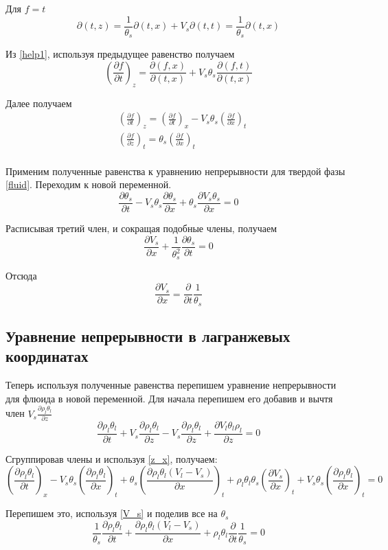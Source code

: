 \documentclass[12pt,a4paper]{article}
\newcommand{\pd}[2]{\frac{\partial #1}{\partial #2}}
\begin{document}
Для $ f = t $ 
$$
\partial(t , z) = \frac{1}{\theta_s} \partial(t , x) + V_s \partial(t , t) = \frac{1}{\theta_s} \partial(t , x)
$$

Из \eqref{help1}, используя предыдущее равенство получаем
$$
\left(\pd{f}{t}\right)_z = \pd{(f , x)}{(t , x)} + V_s \theta_s\pd{(f ,t)}{(t , x)}
$$

Далее получаем
\begin{equation}
\begin{aligned}
&\left(\pd{f}{t}\right)_z = \left(\pd{f}{t}\right)_x - V_s\theta_s\left(\pd{f}{x}\right)_t\\
&\left(\pd{f}{z}\right)_t = \theta_s\left(\pd{f}{x}\right)_t\\
\end{aligned}
\label{z_x}
\end{equation}

Применим полученные равенства к уравнению непрерывности для твердой фазы \eqref{fluid}. Переходим к новой переменной.
$$
\pd{\theta_s}{t} - V_s\theta_s\pd{\theta_s}{x} + \theta_s\pd{V_s\theta_s}{x} =0
$$

Расписывая третий член, и сокращая подобные члены, получаем
$$
\pd{V_s}{x} + \frac{1}{\theta_s^2}\pd{\theta_s}{t} = 0
$$

Отсюда
\begin{equation}
\pd{V_s}{x} = \pd{}{t}\frac{1}{\theta_s}
\label{V_s}
\end{equation}

\subsection{Уравнение непрерывности в лагранжевых координатах}
Теперь используя полученные равенства перепишем уравнение непрерывности для флюида в новой переменной. Для начала перепишем его добавив и вычтя член $V_s\pd{\rho_l\theta_l}{z} $
$$
\pd{\rho_l\theta_l}{t} + V_s\pd{\rho_l\theta_l}{z} - V_s\pd{\rho_l\theta_l}{z} + \pd{V_l\theta_l\rho_l}{z} =0
$$

Сгруппировав члены и используя \eqref{z_x}, получаем:
$$
\left(\pd{\rho_l\theta_l}{t}\right)_x - V_s\theta_s \left(\pd{\rho_l\theta_l}{x}\right)_t + \theta_s\left(\pd{\rho_l\theta_l(V_l - V_s)}{x}\right)_t + \rho_l\theta_l\theta_s\left(\pd{V_s}{x}\right)_t + V_s\theta_s \left(\pd{\rho_l\theta_l}{x}\right)_t = 0
$$

Перепишем это, используя \eqref{V_s} и поделив все на $\theta_s$
$$
\frac{1}{\theta_s}\pd{\rho_l\theta_l}{t} + \pd{\rho_l\theta_l(V_l-V_s)}{x} + \rho_l\theta_l\pd{}{t}\frac{1}{\theta_s} = 0
$$
\end{document}
